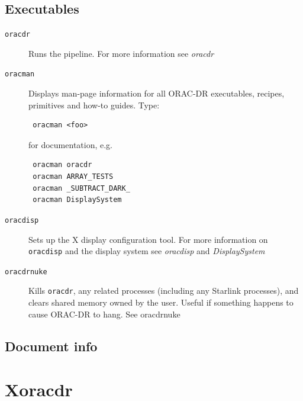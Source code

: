 \documentclass[twoside,11pt]{article}
\renewcommand{\_}{\texttt{\symbol{95}}}
\begin{document}
\subsection*{Executables\label{ORAC-DR_Components_Executables}}
\begin{description}

\item[{\texttt{oracdr}}] \mbox{}

Runs the pipeline. For more information see \emph{oracdr}


\item[{\texttt{oracman}}] \mbox{}

Displays man-page information for all ORAC-DR executables, recipes,
primitives and how-to guides. Type:

\begin{verbatim}
 oracman <foo>
\end{verbatim}


for documentation, e.g.

\begin{verbatim}
 oracman oracdr
 oracman ARRAY_TESTS
 oracman _SUBTRACT_DARK_
 oracman DisplaySystem
\end{verbatim}

\item[{\texttt{oracdisp}}] \mbox{}

Sets up the X display configuration tool. For more information on
\texttt{oracdisp} and the display system see \emph{oracdisp} and \emph{DisplaySystem}


\item[{\texttt{oracdr\_nuke}}] \mbox{}

Kills \texttt{oracdr}, any related processes (including any Starlink
processes), and clears shared memory owned by the user. Useful if
something happens to cause ORAC-DR to hang. See \textsf{oracdr\_nuke}

\end{description}
\subsection*{Document info\label{ORAC-DR_Components_Document_info}}

\section{Xoracdr\label{Xoracdr}}
\end{document}
